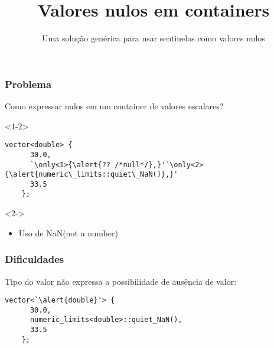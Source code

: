 \documentclass[t]{beamer}
\title{Valores nulos em containers}
\subtitle{Uma solução genérica para usar sentinelas como valores nulos}
\date{}
\begin{document}

\begin{frame}
  \titlepage
\end{frame}

\begin{frame}[fragile]
  \frametitle{Problema}
  Como expressar nulos em um container de valores escalares?

  \begin{onlyenv}<1-2>
  \begin{lstlisting}[escapeinside=`']
    vector<double> {
      30.0,
      `\only<1>{\alert{?? /*null*/},}'`\only<2>{\alert{numeric\_limits::quiet\_NaN()},}'
      33.5
    };
  \end{lstlisting}
  \end{onlyenv}

  \begin{onlyenv}<2->
    \begin{itemize}
    \item{Uso de NaN(not a number)}
    \end{itemize}
  \end{onlyenv}

\end{frame}

\begin{frame}[fragile]
  \frametitle{Dificuldades}
  Tipo do valor não expressa a possibilidade de ausência de valor:
  \begin{lstlisting}[escapeinside=`']
    vector<`\alert{double}'> {
      30.0,
      numeric_limits<double>::quiet_NaN(),
      33.5
    };
  \end{lstlisting}

\end{frame}
\end{document}

